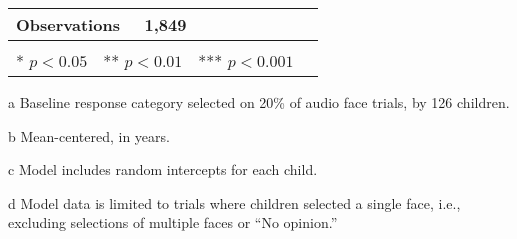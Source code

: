 \begin{table}[ht]
\begin{threeparttable}
\begin{tabular}{lllrllllr}
\textbf{Observations}\tnote{d} & 1,849  &  &  &  &  &  &  \\
\bottomrule\\[-.75em]
\multicolumn{8}{r}{* $p<0.05$~~** $p<0.01$~~*** $p<0.001$}\\
\end{tabular}
\begin{tablenotes}[flushleft]
    \item[a] Baseline response category selected on 20\% of audio face trials, by 126 children. %
    \item[b] Mean-centered, in years.
    \item[c] Model includes random intercepts for each child.
    \item[d] Model data is limited to trials where children selected a single face, i.e., excluding selections of multiple faces or ``No opinion.'' 
\end{tablenotes}
\end{threeparttable}
\end{table}